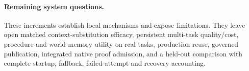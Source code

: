 \paragraph{Remaining system questions.}
These increments establish local mechanisms and expose limitations. They leave
open matched context-substitution efficacy, persistent multi-task quality/cost,
procedure and world-memory utility on real tasks, production reuse, governed
publication, integrated native proof admission, and a held-out comparison with complete
startup, fallback, failed-attempt and recovery accounting.
